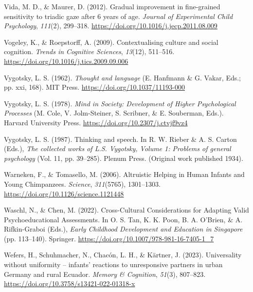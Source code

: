 \documentclass[
]{scrbook}
\newlength{\cslhangindent}
\newenvironment{CSLReferences}[2] %
 {\begin{list}{}{%
  \setlength{\itemindent}{0pt}
  \setlength{\leftmargin}{0pt}
  \setlength{\parsep}{0pt}
  \ifodd #1
   \setlength{\leftmargin}{\cslhangindent}
   \setlength{\itemindent}{-1\cslhangindent}
  \fi
  \setlength{\itemsep}{#2\baselineskip}}}
 {\end{list}}
\begin{document}
\begin{CSLReferences}{1}{0}
Vida, M. D., \& Maurer, D. (2012). Gradual improvement in fine-grained sensitivity to triadic gaze after 6 years of age. \emph{Journal of Experimental Child Psychology}, \emph{111}(2), 299--318. \url{https://doi.org/10.1016/j.jecp.2011.08.009}

Vogeley, K., \& Roepstorff, A. (2009). Contextualising culture and social cognition. \emph{Trends in Cognitive Sciences}, \emph{13}(12), 511--516. \url{https://doi.org/10.1016/j.tics.2009.09.006}

Vygotsky, L. S. (1962). \emph{Thought and language} (E. Hanfmann \& G. Vakar, Eds.; pp. xxi, 168). MIT Press. \url{https://doi.org/10.1037/11193-000}

Vygotsky, L. S. (1978). \emph{Mind in {Society}: {Development} of {Higher Psychological Processes}} (M. Cole, V. Jolm-Steiner, S. Scribner, \& E. Souberman, Eds.). Harvard University Press. \url{https://doi.org/10.2307/j.ctvjf9vz4}

Vygotsky, L. S. (1987). Thinking and speech. In R. W. Rieber \& A. S. Carton (Eds.), \emph{The collected works of {L}.{S}. {Vygotsky}, {Volume} 1: {Problems} of general psychology} (Vol. 11, pp. 39--285). Plenum Press. (Original work published 1934).

Warneken, F., \& Tomasello, M. (2006). Altruistic {Helping} in {Human Infants} and {Young Chimpanzees}. \emph{Science}, \emph{311}(5765), 1301--1303. \url{https://doi.org/10.1126/science.1121448}

Waschl, N., \& Chen, M. (2022). Cross-{Cultural Considerations} for {Adapting Valid Psychoeducational Assessments}. In O. S. Tan, K. K. Poon, B. A. O'Brien, \& A. Rifkin-Graboi (Eds.), \emph{Early {Childhood Development} and {Education} in {Singapore}} (pp. 113--140). Springer. \url{https://doi.org/10.1007/978-981-16-7405-1_7}

Wefers, H., Schuhmacher, N., Chacón, L. H., \& Kärtner, J. (2023). Universality without uniformity -- infants' reactions to unresponsive partners in urban {Germany} and rural {Ecuador}. \emph{Memory \& Cognition}, \emph{51}(3), 807--823. \url{https://doi.org/10.3758/s13421-022-01318-x}


\end{CSLReferences}
\end{document}
